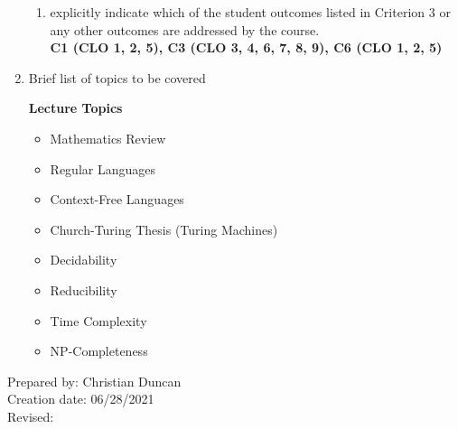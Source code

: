 \begin{enumerate}[1.]
\begin{enumerate}
\item explicitly indicate which of the student outcomes listed in Criterion 3 or any other outcomes are addressed by the course.\\
  {\bfseries
    C1 (CLO 1, 2, 5),
    C3 (CLO 3, 4, 6, 7, 8, 9),
    C6 (CLO 1, 2, 5)
  }
\end{enumerate}

\item Brief list of topics to be covered\\
  {\bfseries
    Lecture Topics
    \begin{itemize}
    \item Mathematics Review
    \item Regular Languages
    \item Context-Free Languages
    \item Church-Turing Thesis (Turing Machines)
    \item Decidability
    \item Reducibility
    \item Time Complexity
    \item NP-Completeness
    \end{itemize}
  }

\end{enumerate}

\noindent Prepared by: Christian Duncan\\
\noindent Creation date: 06/28/2021\\
\noindent Revised:\\
